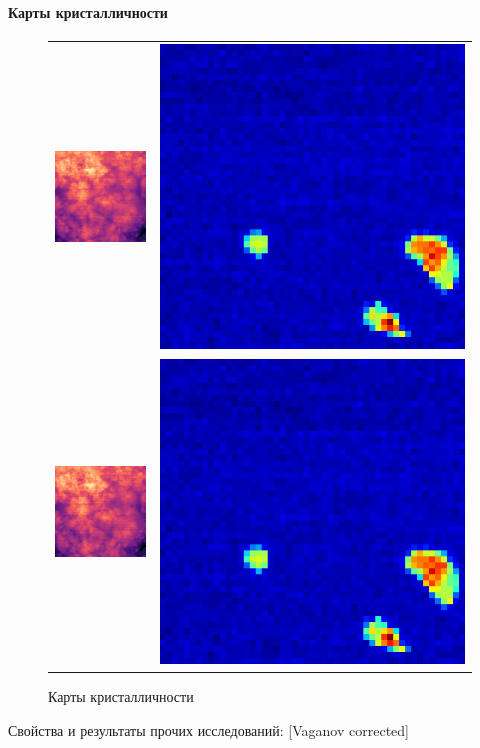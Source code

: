 	\paragraph{Карты кристалличности}
	
	\begin{figure}[ht]\center
\begin{tabular}{cc}
\includegraphics[width=0.5\linewidth]{fig/map-1.png}
&
\includegraphics[width=0.5\linewidth]{fig/map-2.png} \\
\includegraphics[width=0.5\linewidth]{fig/map-1.png}
&
\includegraphics[width=0.5\linewidth]{fig/map-2.png}
\end{tabular}
\caption{Карты кристалличности}
\end{figure}
	
	

	
	
	
	Свойства и результаты прочих исследований:
	[Vaganov corrected]